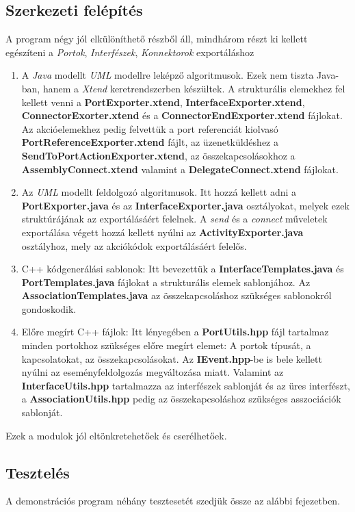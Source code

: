 \documentclass[a4paper,12pt]{report}
\begin{document}
\subsection{Szerkezeti felépítés}
A program négy jól elkülöníthető részből áll, mindhárom részt ki kellett egészíteni a \textit{Portok}, \textit{Interfészek}, \textit{Konnektorok} exportáláshoz

\begin{enumerate}
\item A \textit{Java} modellt \textit{UML} modellre leképző algoritmusok. Ezek nem tiszta Java-ban, hanem a \textit{Xtend} keretrendszerben készültek. A strukturális elemekhez fel kellett venni a \textbf{PortExporter.xtend}, \textbf{InterfaceExporter.xtend}, \textbf{ConnectorExorter.xtend} és a \textbf{ConnectorEndExporter.xtend} fájlokat. Az akcióelemekhez pedig felvettük a port referenciát kiolvasó \textbf{PortReferenceExporter.xtend} fájlt, az üzenetküldéshez a \textbf{SendToPortActionExporter.xtend}, az összekapcsolásokhoz a \textbf{AssemblyConnect.xtend} valamint a \textbf{DelegateConnect.xtend} fájlokat.
\item Az \textit{UML} modellt feldolgozó algoritmusok. Itt hozzá kellett adni a  \textbf{PortExporter.java} és az \textbf{InterfaceExporter.java} osztályokat, melyek ezek struktúrájának az exportálásáért felelnek. A \textit{send} és a \textit{connect} műveletek exportálása végett hozzá kellett nyúlni az \textbf{ActivityExporter.java} osztályhoz, mely az akciókódok exportálásáért felelős.
\item C++ kódgenerálási sablonok: Itt bevezettük a \textbf{InterfaceTemplates.java} és \textbf{PortTemplates.java} fájlokat a strukturális elemek sablonjához. Az \textbf{AssociationTemplates.java} az összekapcsoláshoz szükséges sablonokról gondoskodik.
\item Előre megírt C++ fájlok: Itt lényegében a \textbf{PortUtils.hpp} fájl tartalmaz minden portokhoz szükséges előre megírt elemet: A portok típusát, a kapcsolatokat, az összekapcsolásokat. Az \textbf{IEvent.hpp}-be is bele kellett nyúlni az eseményfeldolgozás megváltozása miatt. Valamint az \textbf{InterfaceUtils.hpp} tartalmazza az interfészek sablonját és az üres interfészt, a \textbf{AssociationUtils.hpp} pedig az összekapcsoláshoz szükséges asszociációk sablonját.
\end{enumerate}

Ezek a modulok jól eltönkretehetőek és cserélhetőek. 

\subsection{Tesztelés}
A demonstrációs program néhány tesztesetét szedjük össze az alábbi fejezetben.
\end{document}
